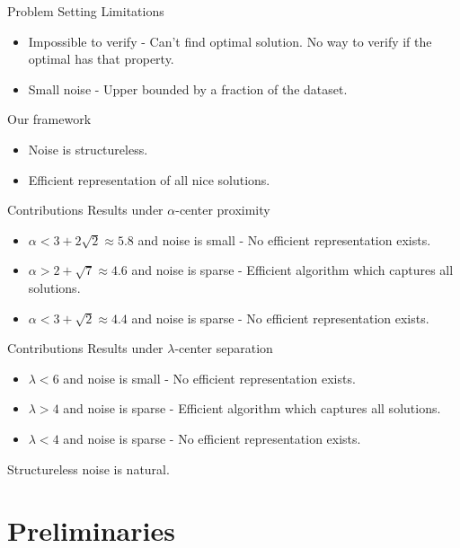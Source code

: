 \documentclass{beamer}
\begin{document}
\begin{frame}{Problem Setting}
  Limitations
  \begin{itemize}
  	\item Impossible to verify - Can't find optimal solution. No way to verify if the optimal has that property.
  	\item Small noise - Upper bounded by a fraction of the dataset.  
  \end{itemize}
  \vspace{0.2in}Our framework
  \begin{itemize}
  	\item Noise is structureless.
  	\item Efficient representation of all nice solutions.
  \end{itemize}
\end{frame}

\begin{frame}{Contributions}
  Results under $\alpha$-center proximity\\
  \begin{itemize}
  	\item $\alpha < 3 + 2\sqrt{2} \approx 5.8$ and noise is small - No efficient representation exists. 
  	\item $\alpha > 2 + \sqrt{7} \approx 4.6$ and noise is sparse - Efficient algorithm which captures all solutions.
  	\item $\alpha < 3 + \sqrt{2} \approx 4.4$ and noise is sparse - No efficient representation exists.
  \end{itemize}
\end{frame}

\begin{frame}{Contributions}
  Results under $\lambda$-center separation\\
 \begin{itemize}
  	\item $\lambda < 6$ and noise is small - No efficient representation exists. 
  	\item $\lambda > 4$ and noise is sparse - Efficient algorithm which captures all solutions.
  	\item $\lambda < 4$ and noise is sparse - No efficient representation exists.
  \end{itemize}
  \vspace{0.2in}Structureless noise is natural.
\end{frame}

\section{Preliminaries}
\end{document}
